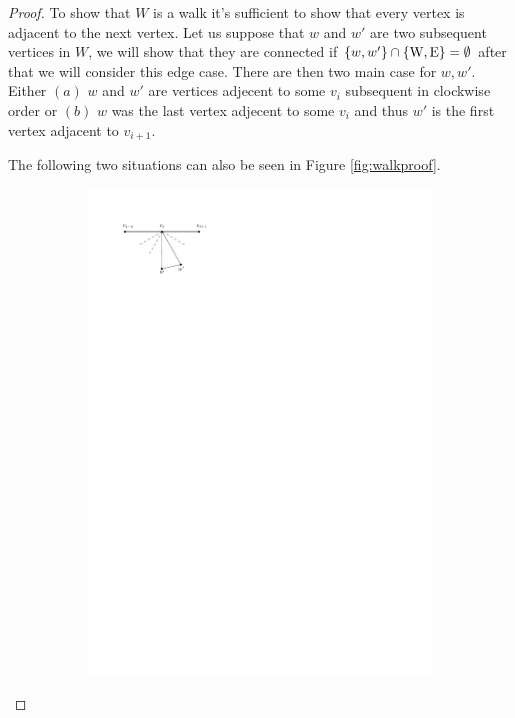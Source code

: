 \begin{proof}
To show that $W$ is a walk it's sufficient to show that every vertex is adjacent to the next vertex. Let us suppose that $w$ and $w'$ are two subsequent vertices in $W$, we will show that they are connected if $\left\lbrace {w, w'} \right\rbrace \cap \left\lbrace {\mathrm{W}, \mathrm{E}} \right\rbrace = \emptyset$ after that we will consider this edge case. There are then two main case for $w, w'$. Either $(a)$ $w$ and $w'$ are  vertices adjecent to some $v_i$ subsequent in clockwise order or $(b)$ $w$ was the last vertex adjecent to some $v_i$ and thus $w'$ is the first vertex adjacent to $v_{i+1}$.

The following two situations can also be seen in Figure \ref{fig:walkproof}.

\begin{figure}
    \centering
    \begin{subfigure}[b]{0.5\linewidth}
        \includegraphics[width=\linewidth]{img/walkProofA}

\end{subfigure}
\end{figure}
\end{proof}
